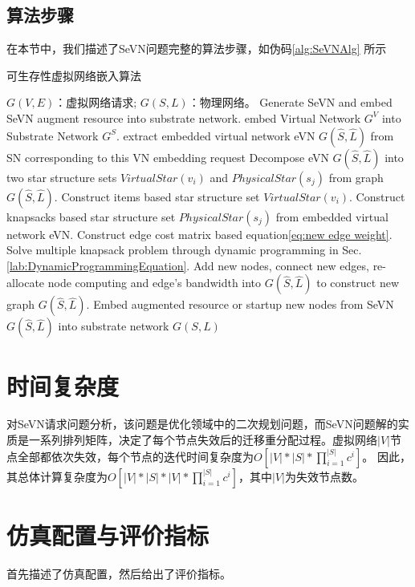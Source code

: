 \subsection{算法步骤}
在本节中，我们描述了SeVN问题完整的算法步骤，如伪码\ref{alg:SeVNAlg} 所示
\begin{algorithm}
\label{alg:SeVNAlg}
\caption{可生存性虚拟网络嵌入算法}
\begin{algorithmic}[1]
\REQUIRE $G (V,E)$：虚拟网络请求; $G (S,L)$：物理网络。
\ENSURE Generate SeVN and embed SeVN augment resource into substrate network.
\STATE embed Virtual Network $G^V$ into Substrate Network $G^S$\cite{liu2011completing}.
\STATE extract embedded virtual network eVN $G\left( {\hat S,\hat L} \right)$ from SN corresponding to this VN embedding request
\STATE Decompose eVN $G\left( {\hat S,\hat L} \right)$ into two star structure sets $VirtualStar(v_i)$ and $PhysicalStar(s_j)$ from graph $G\left( {\hat S,\hat L} \right)$.
\STATE Construct items based star structure set $VirtualStar(v_i)$.
\STATE Construct knapsacks based star structure set $PhysicalStar(s_j)$ from embedded virtual network eVN.
\STATE Construct edge cost matrix based equation\ref{eq:new edge weight}.
\STATE Solve multiple knapsack problem through dynamic programming in Sec.\ref{lab:DynamicProgrammingEquation}.
\STATE Add new nodes, connect new edges, re-allocate node computing and edge's bandwidth into $G\left( {\hat S,\hat L} \right)$ to construct new graph $G\left( {\hat S,\hat L} \right)$.
\ENDFOR
\STATE Embed augmented resource or startup new nodes from SeVN $G\left( {\hat S,\hat L} \right)$ into substrate network $G(S,L)$
\end{algorithmic}
\end{algorithm}
\section{时间复杂度}
对SeVN请求问题分析，该问题是优化领域中的二次规划问题，而SeVN问题解的实质是一系列排列矩阵，决定了每个节点失效后的迁移重分配过程。虚拟网络$|V|$节点全部都依次失效，每个节点的迭代时间复杂度为$O[|V|*|S|*\prod_{i=1}^{|S|}c^i]$。 因此，其总体计算复杂度为$O[|V|*|S|*|V|*\prod_{i=1}^{|S|}c^i]$，其中$|V|$为失效节点数。


\section{仿真配置与评价指标}
首先描述了仿真配置，然后给出了评价指标。
